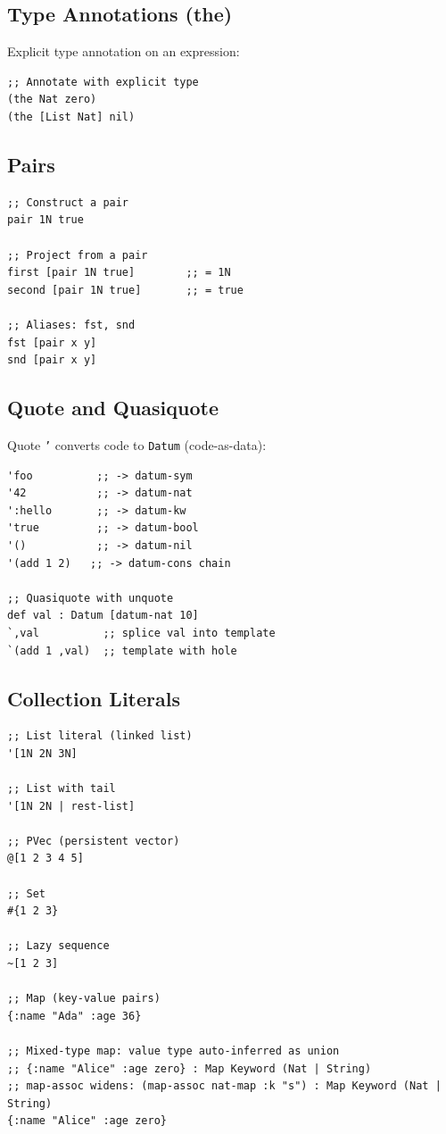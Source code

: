 \documentclass[11pt]{article}
\begin{document}
\subsection{Type Annotations (the)}
\label{sec:org3f66276}

Explicit type annotation on an expression:

\begin{verbatim}
;; Annotate with explicit type
(the Nat zero)
(the [List Nat] nil)
\end{verbatim}
\subsection{Pairs}
\label{sec:org0cf7e33}

\begin{verbatim}
;; Construct a pair
pair 1N true

;; Project from a pair
first [pair 1N true]        ;; = 1N
second [pair 1N true]       ;; = true

;; Aliases: fst, snd
fst [pair x y]
snd [pair x y]
\end{verbatim}
\subsection{Quote and Quasiquote}
\label{sec:org5e347c7}

Quote \texttt{'} converts code to \texttt{Datum} (code-as-data):

\begin{verbatim}
'foo          ;; -> datum-sym
'42           ;; -> datum-nat
':hello       ;; -> datum-kw
'true         ;; -> datum-bool
'()           ;; -> datum-nil
'(add 1 2)   ;; -> datum-cons chain

;; Quasiquote with unquote
def val : Datum [datum-nat 10]
`,val          ;; splice val into template
`(add 1 ,val)  ;; template with hole
\end{verbatim}
\subsection{Collection Literals}
\label{sec:org9d91139}

\begin{verbatim}
;; List literal (linked list)
'[1N 2N 3N]

;; List with tail
'[1N 2N | rest-list]

;; PVec (persistent vector)
@[1 2 3 4 5]

;; Set
#{1 2 3}

;; Lazy sequence
~[1 2 3]

;; Map (key-value pairs)
{:name "Ada" :age 36}

;; Mixed-type map: value type auto-inferred as union
;; {:name "Alice" :age zero} : Map Keyword (Nat | String)
;; map-assoc widens: (map-assoc nat-map :k "s") : Map Keyword (Nat | String)
{:name "Alice" :age zero}
\end{verbatim}
\end{document}
